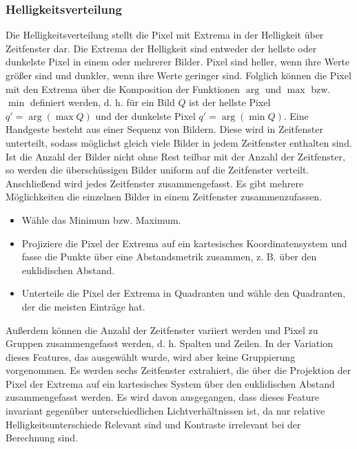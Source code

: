 \subsubsection{Helligkeitsverteilung}
Die Helligkeitsverteilung stellt die Pixel mit Extrema in der Helligkeit über Zeitfenster dar. Die Extrema der Helligkeit sind entweder der hellste oder dunkelste Pixel in einem oder mehrerer Bilder. Pixel
sind heller, wenn ihre Werte größer sind und dunkler, wenn ihre Werte geringer sind. Folglich können die Pixel mit den Extrema über die Komposition der Funktionen $\arg$ und $\max$ bzw. $\min$ definiert werden,
d. h. für ein Bild $Q$ ist der hellste Pixel $q' = \arg(\max Q)$ und der dunkelste Pixel $q' = \arg(\min Q)$.
\newline
\newline
Eine Handgeste besteht aus einer Sequenz von Bildern. Diese wird in Zeitfenster unterteilt, sodass möglichst gleich viele Bilder in jedem Zeitfenster enthalten sind. Ist die Anzahl der Bilder nicht ohne
Rest teilbar mit der Anzahl der Zeitfenster, so werden die überschüssigen Bilder uniform auf die Zeitfenster verteilt. Anschließend wird jedes Zeitfenster zusammengefasst. Es gibt mehrere Möglichkeiten
die einzelnen Bilder in einem Zeitfenster zusammenzufassen.
\begin{itemize}
    \item Wähle das Minimum bzw. Maximum.
    \item Projiziere die Pixel der Extrema auf ein kartesisches Koordinatensystem und fasse die Punkte über eine Abstandsmetrik zusammen, z. B. über den euklidischen Abstand.
    \item Unterteile die Pixel der Extrema in Quadranten und wähle den Quadranten, der die meisten Einträge hat.
\end{itemize}
Außerdem können die Anzahl der Zeitfenster variiert werden und Pixel zu Gruppen zusammengefasst werden, d. h. Spalten und Zeilen. In der Variation dieses Features, das ausgewählt wurde, wird aber
keine Gruppierung vorgenommen. Es werden sechs Zeitfenster extrahiert, die über die Projektion der Pixel der Extrema auf ein kartesisches System über den euklidischen Abstand zusammengefasst werden.
\newline
\newline
Es wird davon ausgegangen, dass dieses Feature invariant gegenüber unterschiedlichen Lichtverhältnissen ist, da nur relative Helligkeitsunterschiede Relevant sind und Kontraste irrelevant bei der
Berechnung sind.

